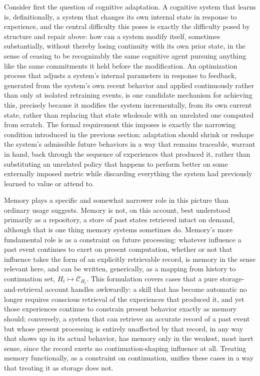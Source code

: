 \documentclass[11pt]{article}
\begin{document}
Consider first the question of cognitive adaptation. A cognitive system that learns is, definitionally, a system that changes its own internal state in response to experience, and the central difficulty this poses is exactly the difficulty posed by structure and repair above: how can a system modify itself, sometimes substantially, without thereby losing continuity with its own prior state, in the sense of ceasing to be recognizably the same cognitive agent pursuing anything like the same commitments it held before the modification. An optimization process that adjusts a system's internal parameters in response to feedback, generated from the system's own recent behavior and applied continuously rather than only at isolated retraining events, is one candidate mechanism for achieving this, precisely because it modifies the system incrementally, from its own current state, rather than replacing that state wholesale with an unrelated one computed from scratch. The formal requirement this imposes is exactly the narrowing condition introduced in the previous section: adaptation should shrink or reshape the system's admissible future behaviors in a way that remains traceable, warrant in hand, back through the sequence of experiences that produced it, rather than substituting an unrelated policy that happens to perform better on some externally imposed metric while discarding everything the system had previously learned to value or attend to.

Memory plays a specific and somewhat narrower role in this picture than ordinary usage suggests. Memory is not, on this account, best understood primarily as a repository, a store of past states retrieved intact on demand, although that is one thing memory systems sometimes do. Memory's more fundamental role is as a constraint on future processing: whatever influence a past event continues to exert on present computation, whether or not that influence takes the form of an explicitly retrievable record, is memory in the sense relevant here, and can be written, generically, as a mapping from history to continuation set, $H_t \mapsto \mathcal{C}_{H_t}$. This formulation covers cases that a pure storage-and-retrieval account handles awkwardly: a skill that has become automatic no longer requires conscious retrieval of the experiences that produced it, and yet those experiences continue to constrain present behavior exactly as memory should; conversely, a system that can retrieve an accurate record of a past event but whose present processing is entirely unaffected by that record, in any way that shows up in its actual behavior, has memory only in the weakest, most inert sense, since the record exerts no continuation-shaping influence at all. Treating memory functionally, as a constraint on continuation, unifies these cases in a way that treating it as storage does not.
\end{document}

